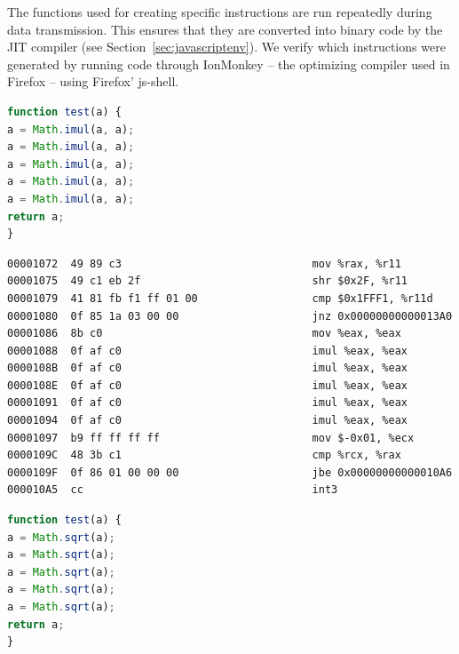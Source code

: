 \documentclass[11pt,
  titlepage=false,
  parskip=half,      %
]{scrreprt}
\begin{document}
The functions used for creating specific instructions are run repeatedly during data transmission.
This ensures that they are converted into binary code by the JIT compiler (see Section~\ref{sec:javascriptenv}).
We verify which instructions were generated by running code through IonMonkey -- the optimizing compiler used in Firefox --
using Firefox' js-shell.

\begin{lstlisting}[float,caption={A test function for the \texttt{imul} instruction},label={lst:testimul},language=JavaScript]
function test(a) {
a = Math.imul(a, a);
a = Math.imul(a, a);
a = Math.imul(a, a);
a = Math.imul(a, a);
a = Math.imul(a, a);
return a;
}
\end{lstlisting}

\begin{lstlisting}[float,caption={The compiled result of the \texttt{imul} test function},label={lst:compileimul}]
00001072  49 89 c3                              mov %rax, %r11
00001075  49 c1 eb 2f                           shr $0x2F, %r11
00001079  41 81 fb f1 ff 01 00                  cmp $0x1FFF1, %r11d
00001080  0f 85 1a 03 00 00                     jnz 0x00000000000013A0
00001086  8b c0                                 mov %eax, %eax
00001088  0f af c0                              imul %eax, %eax
0000108B  0f af c0                              imul %eax, %eax
0000108E  0f af c0                              imul %eax, %eax
00001091  0f af c0                              imul %eax, %eax
00001094  0f af c0                              imul %eax, %eax
00001097  b9 ff ff ff ff                        mov $-0x01, %ecx
0000109C  48 3b c1                              cmp %rcx, %rax
0000109F  0f 86 01 00 00 00                     jbe 0x00000000000010A6
000010A5  cc                                    int3
\end{lstlisting}

\begin{lstlisting}[float,caption={A test function for the \texttt{sqrt} instruction},label={lst:testsqrt},language=JavaScript]
function test(a) {
a = Math.sqrt(a);
a = Math.sqrt(a);
a = Math.sqrt(a);
a = Math.sqrt(a);
a = Math.sqrt(a);
return a;
}
\end{lstlisting}
\end{document}
